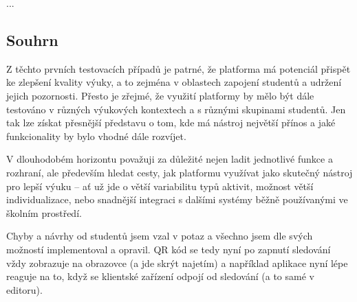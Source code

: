 ...

\subsection{Souhrn}

Z těchto prvních testovacích případů je patrné, že platforma má potenciál přispět ke zlepšení kvality výuky, a to zejména v oblastech zapojení studentů a udržení jejich pozornosti. 
Přesto je zřejmé, že využití platformy by mělo být dále testováno v různých výukových kontextech a s různými skupinami studentů. 
Jen tak lze získat přesnější představu o tom, kde má nástroj největší přínos a jaké funkcionality by bylo vhodné dále rozvíjet.

V dlouhodobém horizontu považuji za důležité nejen ladit jednotlivé funkce a rozhraní, ale především hledat cesty, jak platformu využívat jako skutečný nástroj pro lepší výuku -- ať už jde o větší variabilitu typů aktivit, možnost větší individualizace, nebo snadnější integraci s dalšími systémy běžně používanými ve školním prostředí.

Chyby a návrhy od studentů jsem vzal v potaz a všechno jsem dle svých možností implementoval a opravil.
QR kód se tedy nyní po zapnutí sledování vždy zobrazuje na obrazovce (a jde skrýt najetím) a například aplikace nyní lépe reaguje na to, když se klientské zařízení odpojí od sledování (a to samé v editoru).